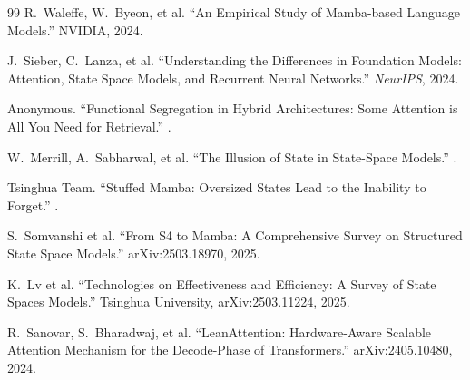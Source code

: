 \documentclass[11pt,a4paper]{article}
\begin{document}
\begin{thebibliography}{99}
 R.~Waleffe, W.~Byeon, et al.
\newblock ``An Empirical Study of Mamba-based Language Models.''
\newblock NVIDIA, 2024.

 J.~Sieber, C.~Lanza, et al.
\newblock ``Understanding the Differences in Foundation Models: Attention, State Space Models, and Recurrent Neural Networks.''
\newblock \textit{NeurIPS}, 2024.

 Anonymous.
\newblock ``Functional Segregation in Hybrid Architectures: Some Attention is All You Need for Retrieval.''
.

 W.~Merrill, A.~Sabharwal, et al.
\newblock ``The Illusion of State in State-Space Models.''
.

 Tsinghua Team.
\newblock ``Stuffed Mamba: Oversized States Lead to the Inability to Forget.''
.

 S.~Somvanshi et al.
\newblock ``From S4 to Mamba: A Comprehensive Survey on Structured State Space Models.''
\newblock arXiv:2503.18970, 2025.

 K.~Lv et al.
\newblock ``Technologies on Effectiveness and Efficiency: A Survey of State Spaces Models.''
\newblock Tsinghua University, arXiv:2503.11224, 2025.

 R.~Sanovar, S.~Bharadwaj, et al.
\newblock ``LeanAttention: Hardware-Aware Scalable Attention Mechanism for the Decode-Phase of Transformers.''
\newblock arXiv:2405.10480, 2024.

\end{thebibliography}
\end{document}

